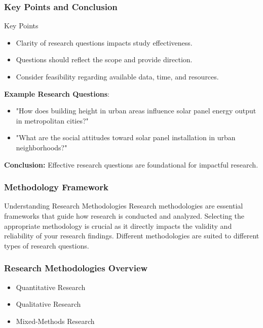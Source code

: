 \documentclass[aspectratio=169]{beamer}
\begin{document}
\begin{frame}[fragile]
    \frametitle{Key Points and Conclusion}
    \begin{block}{Key Points}
        \begin{itemize}
            \item Clarity of research questions impacts study effectiveness.
            \item Questions should reflect the scope and provide direction.
            \item Consider feasibility regarding available data, time, and resources.
        \end{itemize}
    \end{block}
    \vfill
    \textbf{Example Research Questions}:
    \begin{itemize}
        \item "How does building height in urban areas influence solar panel energy output in metropolitan cities?"
        \item "What are the social attitudes toward solar panel installation in urban neighborhoods?"
    \end{itemize}
    \vfill
    \textbf{Conclusion:} Effective research questions are foundational for impactful research.
\end{frame}

\begin{frame}[fragile]
    \frametitle{Methodology Framework}
    \begin{block}{Understanding Research Methodologies}
        Research methodologies are essential frameworks that guide how research is conducted and analyzed. Selecting the appropriate methodology is crucial as it directly impacts the validity and reliability of your research findings. Different methodologies are suited to different types of research questions.
    \end{block}
\end{frame}

\begin{frame}[fragile]
    \frametitle{Research Methodologies Overview}
    \begin{itemize}
        \item Quantitative Research
        \item Qualitative Research
        \item Mixed-Methods Research
    \end{itemize}
\end{frame}
\end{document}
